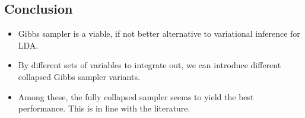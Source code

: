 \documentclass[a0,portrait]{a0poster}
\begin{document}
\begin{multicols}{2}

\section{Conclusion}

\large{
\begin{itemize}
	\item Gibbs sampler is a viable, if not better alternative to variational inference for LDA. 
	\item By different sets of variables to integrate out, we can introduce different collapsed Gibbs sampler
		variants.
	\item Among these, the fully collapsed sampler seems to yield the best performance. This is in line
		with the literature.
\end{itemize}
}





\end{multicols}
\end{document}
